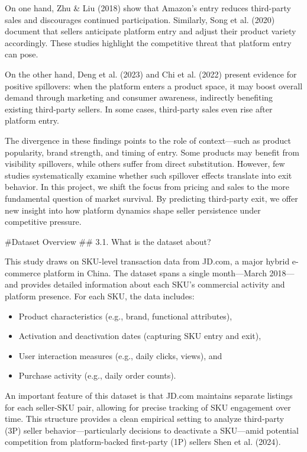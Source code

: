 \documentclass[
  letterpaper,
  DIV=11,
  numbers=noendperiod]{scrartcl}
\providecommand{\tightlist}{%
  \setlength{\itemsep}{0pt}\setlength{\parskip}{0pt}}\usepackage{longtable,booktabs,array}
\begin{document}
On one hand, Zhu \& Liu (2018) show that Amazon's entry reduces
third-party sales and discourages continued participation. Similarly,
Song et al. (2020) document that sellers anticipate platform entry and
adjust their product variety accordingly. These studies highlight the
competitive threat that platform entry can pose.

On the other hand, Deng et al. (2023) and Chi et al. (2022) present
evidence for positive spillovers: when the platform enters a product
space, it may boost overall demand through marketing and consumer
awareness, indirectly benefiting existing third-party sellers. In some
cases, third-party sales even rise after platform entry.

The divergence in these findings points to the role of context---such as
product popularity, brand strength, and timing of entry. Some products
may benefit from visibility spillovers, while others suffer from direct
substitution. However, few studies systematically examine whether such
spillover effects translate into exit behavior. In this project, we
shift the focus from pricing and sales to the more fundamental question
of market survival. By predicting third-party exit, we offer new insight
into how platform dynamics shape seller persistence under competitive
pressure.

\#Dataset Overview \#\# 3.1. What is the dataset about?

This study draws on SKU-level transaction data from JD.com, a major
hybrid e-commerce platform in China. The dataset spans a single
month---March 2018---and provides detailed information about each SKU's
commercial activity and platform presence. For each SKU, the data
includes:

\begin{itemize}
\tightlist
\item
  Product characteristics (e.g., brand, functional attributes),
\item
  Activation and deactivation dates (capturing SKU entry and exit),
\item
  User interaction measures (e.g., daily clicks, views), and
\item
  Purchase activity (e.g., daily order counts).
\end{itemize}

An important feature of this dataset is that JD.com maintains separate
listings for each seller-SKU pair, allowing for precise tracking of SKU
engagement over time. This structure provides a clean empirical setting
to analyze third-party (3P) seller behavior---particularly decisions to
deactivate a SKU---amid potential competition from platform-backed
first-party (1P) sellers Shen et al. (2024).
\end{document}
